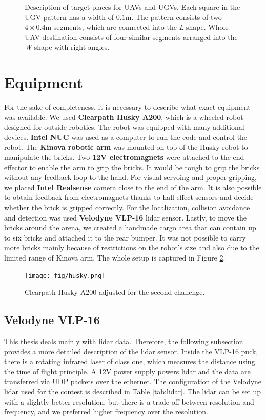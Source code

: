 \begin{figure}[H]
\caption[Brick destinations]{Description of target places for UAVs and UGVs. Each square in the UGV pattern has a width of $0.1$m. The pattern consists of two $4\times0.4$m segments, which are connected into the \textit{L} shape. Whole UAV destination consists of four similar segments arranged into the \textit{W} shape with right angles.}
\label{fig:dest}
\end{figure}


\section{Equipment}
For the sake of completeness, it is necessary to describe what exact equipment was available. We used \textbf{Clearpath Husky A200}, which is a wheeled robot designed for outside robotics. The robot was equipped with many additional devices. \textbf{Intel NUC} was used as a computer to run the code and control the robot. The \textbf{Kinova robotic arm} was mounted on top of the Husky robot to manipulate the bricks. Two \textbf{12V electromagnets} were attached to the end-effector to enable the arm to grip the bricks. It would be tough to grip the bricks without any feedback loop to the hand. For visual servoing and proper gripping, we placed \textbf{Intel Realsense} camera close to the end of the arm. It is also possible to obtain feedback from electromagnets thanks to hall effect sensors and decide whether the brick is gripped correctly. For the localization, collision avoidance and detection was used \textbf{Velodyne VLP-16} lidar sensor. Lastly, to move the bricks around the arena, we created a handmade cargo area that can contain up to six bricks and attached it to the rear bumper. It was not possible to carry more bricks mainly because of restrictions on the robot's size and also due to the limited range of Kinova arm. The whole setup is captured in Figure \ref{fig:husky}.

\begin{figure}[H]
\centering
\texttt{[image: fig/husky.png]}
\caption[UGV setup]{Clearpath Husky A200 adjusted for the second challenge.}
\label{fig:husky}

\end{figure}

\subsection{Velodyne VLP-16}
This thesis deals mainly with lidar data. Therefore, the following subsection provides a more detailed description of the lidar sensor. Inside the VLP-16 puck, there is a rotating infrared laser of class one, which measures the distance using the time of flight principle. A 12V power supply powers lidar and the data are transferred via UDP packets over the ethernet. The configuration of the Velodyne lidar used for the contest is described in Table \ref{tab:lidar}. The lidar can be set up with a slightly better resolution, but there is a trade-off between resolution and frequency, and we preferred higher frequency over the resolution.

